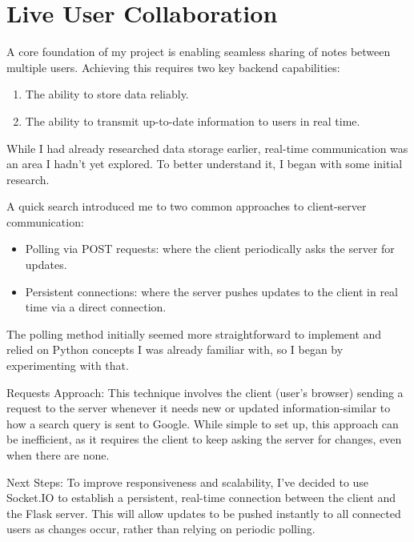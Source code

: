 \section{Live User Collaboration}
\label{research:LiveUserCollaboration}

A core foundation of my project is enabling seamless sharing of notes between multiple users. Achieving this requires two key backend capabilities:
\begin{enumerate}
    \item The ability to store data reliably.
    \item The ability to transmit up-to-date information to users in real time.
\end{enumerate}
While I had already researched data storage earlier, real-time communication was an area I hadn't yet explored. To better understand it, I began with some initial research.

A quick search introduced me to two common approaches to client-server communication:
\begin{itemize}
    \item Polling via POST requests: where the client periodically asks the server for updates.
    \item Persistent connections: where the server pushes updates to the client in real time via a direct connection.
\end{itemize}

The polling method initially seemed more straightforward to implement and relied on Python concepts I was already familiar with, so I began by experimenting with that.

Requests Approach:
This technique involves the client (user's browser) sending a request to the server whenever it needs new or updated information-similar to how a search query is sent to Google. While simple to set up, this approach can be inefficient, as it requires the client to keep asking the server for changes, even when there are none.

Next Steps:
To improve responsiveness and scalability, I've decided to use Socket.IO \cite{IntroductionSocketIO2025} to establish a persistent, real-time connection between the client and the Flask server. This will allow updates to be pushed instantly to all connected users as changes occur, rather than relying on periodic polling.
